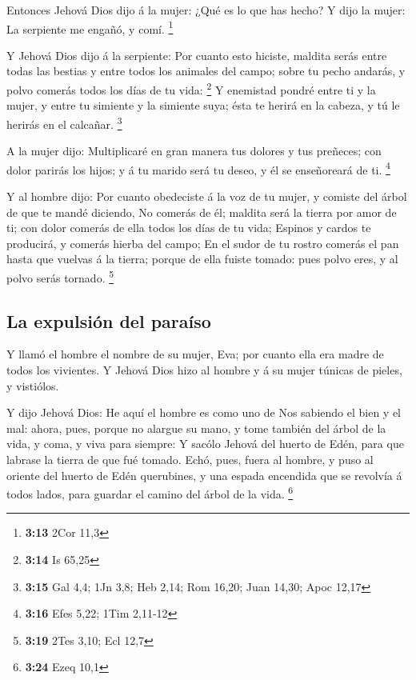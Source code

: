  Entonces Jehová Dios dijo á la mujer: ¿Qué es lo que has
hecho? Y dijo la mujer: La serpiente me engañó, y comí. \footnote{\textbf{3:13}
  2Cor 11,3}

 Y Jehová Dios dijo á la serpiente: Por cuanto esto
hiciste, maldita serás entre todas las bestias y entre todos los
animales del campo; sobre tu pecho andarás, y polvo comerás todos los
días de tu vida: \footnote{\textbf{3:14} Is 65,25}  Y
enemistad pondré entre ti y la mujer, y entre tu simiente y la simiente
suya; ésta te herirá en la cabeza, y tú le herirás en el calcañar.
\footnote{\textbf{3:15} Gal 4,4; 1Jn 3,8; Heb 2,14; Rom 16,20; Juan
  14,30; Apoc 12,17}

 A la mujer dijo: Multiplicaré en gran manera tus dolores y
tus preñeces; con dolor parirás los hijos; y á tu marido será tu deseo,
y él se enseñoreará de ti. \footnote{\textbf{3:16} Efes 5,22; 1Tim
  2,11-12}

 Y al hombre dijo: Por cuanto obedeciste á la voz de tu
mujer, y comiste del árbol de que te mandé diciendo, No comerás de él;
maldita será la tierra por amor de ti; con dolor comerás de ella todos
los días de tu vida;  Espinos y cardos te producirá, y
comerás hierba del campo;  En el sudor de tu rostro comerás
el pan hasta que vuelvas á la tierra; porque de ella fuiste tomado: pues
polvo eres, y al polvo serás tornado. \footnote{\textbf{3:19} 2Tes 3,10;
  Ecl 12,7}

\hypertarget{la-expulsiuxf3n-del-parauxedso}{%
\subsection{La expulsión del
paraíso}\label{la-expulsiuxf3n-del-parauxedso}}

 Y llamó el hombre el nombre de su mujer, Eva; por cuanto
ella era madre de todos los vivientes.  Y Jehová Dios hizo
al hombre y á su mujer túnicas de pieles, y vistiólos.

 Y dijo Jehová Dios: He aquí el hombre es como uno de Nos
sabiendo el bien y el mal: ahora, pues, porque no alargue su mano, y
tome también del árbol de la vida, y coma, y viva para siempre:
 Y sacólo Jehová del huerto de Edén, para que labrase la
tierra de que fué tomado.  Echó, pues, fuera al hombre, y
puso al oriente del huerto de Edén querubines, y una espada encendida
que se revolvía á todos lados, para guardar el camino del árbol de la
vida. \footnote{\textbf{3:24} Ezeq 10,1}

